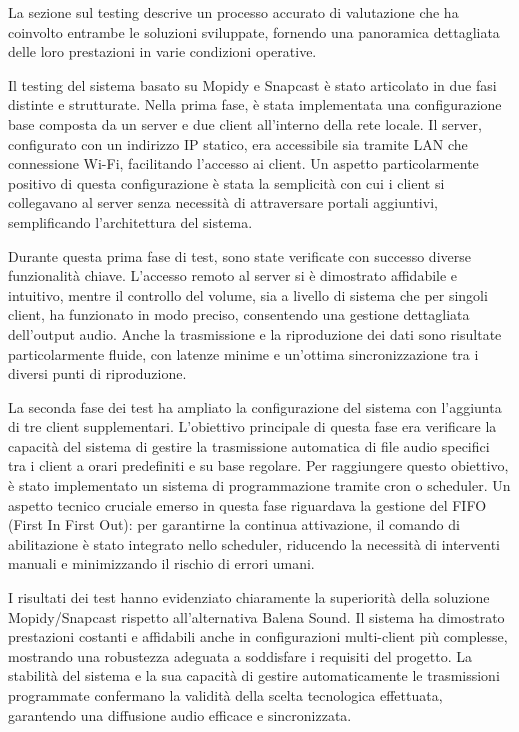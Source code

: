La sezione sul testing descrive un processo accurato di valutazione che ha coinvolto entrambe le soluzioni sviluppate, fornendo una panoramica dettagliata delle loro prestazioni in varie condizioni operative.

Il testing del sistema basato su Mopidy e Snapcast è stato articolato in due fasi distinte e strutturate. Nella prima fase, è stata implementata una configurazione base composta da un server e due client all'interno della rete locale. Il server, configurato con un indirizzo IP statico, era accessibile sia tramite LAN che connessione Wi-Fi, facilitando l'accesso ai client. Un aspetto particolarmente positivo di questa configurazione è stata la semplicità con cui i client si collegavano al server senza necessità di attraversare portali aggiuntivi, semplificando l'architettura del sistema.

Durante questa prima fase di test, sono state verificate con successo diverse funzionalità chiave. L’accesso remoto al server si è dimostrato affidabile e intuitivo, mentre il controllo del volume, sia a livello di sistema che per singoli client, ha funzionato in modo preciso, consentendo una gestione dettagliata dell'output audio. Anche la trasmissione e la riproduzione dei dati sono risultate particolarmente fluide, con latenze minime e un'ottima sincronizzazione tra i diversi punti di riproduzione.

La seconda fase dei test ha ampliato la configurazione del sistema con l’aggiunta di tre client supplementari. L'obiettivo principale di questa fase era verificare la capacità del sistema di gestire la trasmissione automatica di file audio specifici tra i client a orari predefiniti e su base regolare. Per raggiungere questo obiettivo, è stato implementato un sistema di programmazione tramite cron o scheduler. Un aspetto tecnico cruciale emerso in questa fase riguardava la gestione del FIFO (First In First Out): per garantirne la continua attivazione, il comando di abilitazione è stato integrato nello scheduler, riducendo la necessità di interventi manuali e minimizzando il rischio di errori umani.

I risultati dei test hanno evidenziato chiaramente la superiorità della soluzione Mopidy/Snapcast rispetto all'alternativa Balena Sound. Il sistema ha dimostrato prestazioni costanti e affidabili anche in configurazioni multi-client più complesse, mostrando una robustezza adeguata a soddisfare i requisiti del progetto. La stabilità del sistema e la sua capacità di gestire automaticamente le trasmissioni programmate confermano la validità della scelta tecnologica effettuata, garantendo una diffusione audio efficace e sincronizzata.